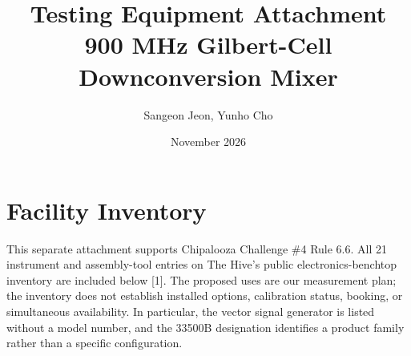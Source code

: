 \documentclass[10pt,letterpaper]{article}
\title{\textbf{Testing Equipment Attachment}\\900 MHz Gilbert-Cell Downconversion Mixer}
\author{Sangeon Jeon, Yunho Cho}
\date{November 2026}
\begin{document}
\maketitle

\section{Facility Inventory}

This separate attachment supports Chipalooza Challenge \#4 Rule 6.6.
All 21 instrument and assembly-tool entries on The Hive's public electronics-benchtop inventory are included below [1].
The proposed uses are our measurement plan; the inventory does not establish installed options, calibration status, booking, or simultaneous availability.
In particular, the vector signal generator is listed without a model number, and the 33500B designation identifies a product family rather than a specific configuration.
\end{document}
